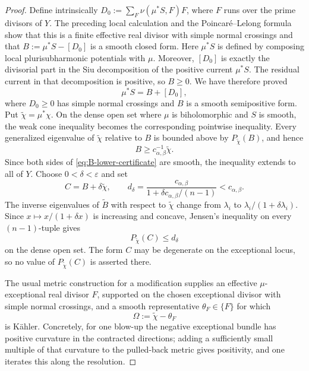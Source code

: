 \documentclass[reqno]{amsart}
\newcommand{\cab}{c_{\alpha,\beta}}
\theoremstyle{plain}
\theoremstyle{remark}
\begin{document}
\begin{proof}
Define intrinsically
$D_0:=\sum_F\nu(\mu^*S,F)F$,
where $F$ runs over the prime divisors of $Y$.  The preceding local
calculation and the Poincar\'e--Lelong formula show that this is a finite
effective real divisor with simple normal crossings and that
$B:=\mu^*S-[D_0]$ is a smooth closed form.  Here $\mu^*S$ is
defined by composing local plurisubharmonic potentials with $\mu$.
Moreover, $[D_0]$ is exactly the divisorial part in the Siu
decomposition of the positive current $\mu^*S$.  The residual current
in that decomposition is positive, so $B\geq0$.  We have therefore
proved
\[
 \mu^*S=B+[D_0],
\]
where $D_0\geq0$ has simple normal crossings and $B$ is a smooth
semipositive form.
Put $\widetilde\chi=\mu^*\chi$. On the dense open set where $\mu$
is biholomorphic and $S$ is smooth, the weak cone inequality becomes
the corresponding pointwise inequality. Every generalized eigenvalue
of $\widetilde\chi$ relative to $B$ is bounded above by
$P_{\widetilde\chi}(B)$, and hence
\begin{equation}\label{eq:B-lower-certificate}
 B\geq\cab^{-1}\widetilde\chi.
\end{equation}  Since both sides of
\eqref{eq:B-lower-certificate} are smooth, the inequality extends to
all of $Y$. Choose $0<\delta<\varepsilon$ and set
\[
 C=B+\delta\widetilde\chi,
 \qquad d_\delta=\frac{\cab}{1+\delta\cab/(n-1)}<\cab.
\]
The inverse eigenvalues of $\widetilde{B}$ with respect to $\widetilde{\chi}$ change from $\lambda_i$ to
$\lambda_i/(1+\delta\lambda_i)$. Since
$x\mapsto x/(1+\delta x)$ is increasing and concave, Jensen's
inequality on every $(n-1)$-tuple gives
\begin{equation}\label{eq:certificate-margin}
 P_{\widetilde\chi}(C)\leq d_\delta
\end{equation}
on the dense open set. The form $C$ may be degenerate on the
exceptional locus, so no value of $P_{\widetilde\chi}(C)$ is asserted
there.

The usual metric construction for a modification supplies an effective
$\mu$-exceptional real divisor $F$, supported on the chosen
exceptional divisor with simple normal crossings, and a smooth representative
$\theta_F\in\{F\}$ for which
\[
 \Omega:=\widetilde\chi-\theta_F
\]
is K\"ahler.  Concretely, for one blow-up the negative exceptional
bundle has positive curvature in the contracted directions; adding a
sufficiently small multiple of that curvature to the pulled-back
metric gives positivity, and one iterates this along the resolution.


\end{proof}
\end{document}
